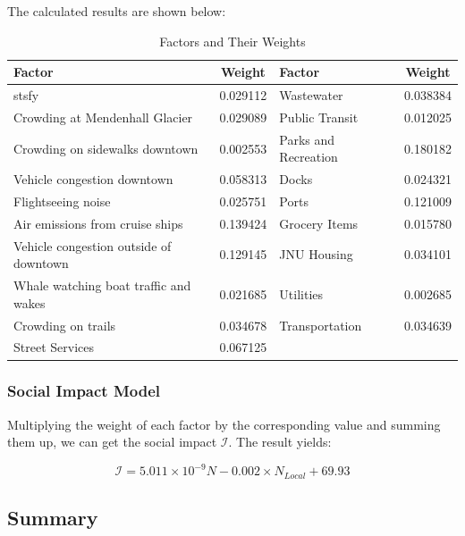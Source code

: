 \vspace{0.5cm}

The calculated results are shown below:

\begin{table}[ht]
    \centering
    \renewcommand{\arraystretch}{1.3}
    \caption{Factors and Their Weights}
    \begin{tabular}{|l|c|l|c|}
    \hline
    \textbf{Factor} & \textbf{Weight} & \textbf{Factor} & \textbf{Weight} \\ \hline
    stsfy & 0.029112 & Wastewater & 0.038384 \\ \hline
    Crowding at Mendenhall Glacier & 0.029089 & Public Transit & 0.012025 \\ \hline
    Crowding on sidewalks downtown & 0.002553 & Parks and Recreation & 0.180182 \\ \hline
    Vehicle congestion downtown & 0.058313 & Docks & 0.024321 \\ \hline
    Flightseeing noise & 0.025751 & Ports & 0.121009 \\ \hline
    Air emissions from cruise ships & 0.139424 & Grocery Items & 0.015780 \\ \hline
    Vehicle congestion outside of downtown & 0.129145 & JNU Housing & 0.034101 \\ \hline
    Whale watching boat traffic and wakes & 0.021685 & Utilities & 0.002685 \\ \hline
    Crowding on trails & 0.034678 & Transportation & 0.034639 \\ \hline
    Street Services & 0.067125 & & \\ \hline
    \end{tabular}
    \end{table}
    
    

\subsubsection{Social Impact Model}

Multiplying the weight of each factor by the corresponding value and summing them up, we can get the social impact $\mathcal{I}$.
The result yields:

\begin{equation}
    \mathcal{I}=5.011\times 10^{-9} N -0.002 \times N_{Local}+69.93
\end{equation}


\subsection{Summary}



